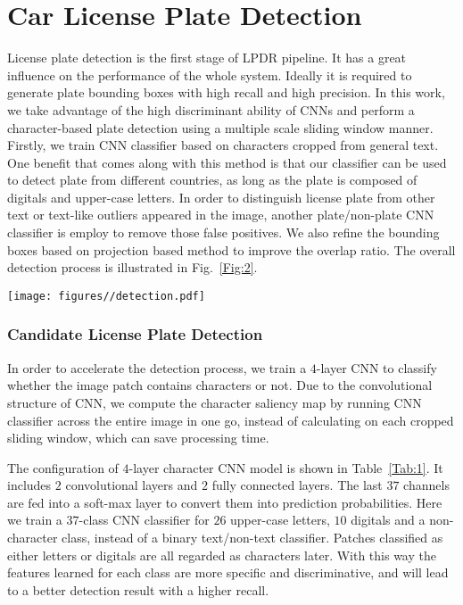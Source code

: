 \documentclass[twocolumn]{svjour3}
\begin{document}
\section{Car License Plate Detection}\label{sec:Detection}

License plate detection is the first stage of LPDR pipeline. It has a great influence on the performance of the whole system. Ideally it is required to generate plate bounding boxes with high recall and high precision. In this work, we take advantage of the high discriminant ability of CNNs and perform a character-based plate detection using a multiple scale sliding window manner. Firstly, we train CNN classifier based on characters cropped from general text. One benefit that comes along with this method is that our classifier can be used to detect plate from different countries, as long as the plate is composed of digitals and upper-case letters. %
In order to distinguish license plate from other text or text-like outliers appeared in the image, %
another plate/non-plate CNN classifier is employ to remove those false positives. We also refine the bounding boxes based on projection based method to improve the overlap ratio.  The overall detection process is illustrated in Fig.~\ref{Fig:2}.

\begin{figure*}[tb]
\centering
\texttt{[image: figures//detection.pdf]}
\caption{license plate detection procedure in a single scale. (a) input image. (b) text salience map generated by CNN classifier. (c) text salience map after NMS and RLSA. (d) candidate bounding boxes generated by CCA. (e) candidate bounding boxes after false positive elimination. (f) final bounding boxes after box refinement.}
\label{Fig:2}
\end{figure*}\setcounter{subsubsection}{0}\subsubsection{Candidate License Plate Detection}
In order to accelerate the detection process, we train a $4$-layer CNN to classify whether the image patch contains characters or not. Due to the convolutional structure of CNN, we compute the character saliency map by running CNN classifier across the entire image in one go, instead of calculating on each cropped sliding window, which can save processing time.

The configuration of $4$-layer character CNN model is shown in Table~\ref{Tab:1}. It includes $2$ convolutional layers and $2$ fully connected layers. The last $37$ channels are fed into a soft-max layer to convert them into prediction probabilities. %
Here we train a $37$-class CNN classifier for $26$ upper-case letters, $10$ digitals and a non-character class, instead of a binary text/non-text classifier. Patches classified as either letters or digitals are all regarded as characters later. With this way the features learned for each class are more specific and discriminative, and will lead to a better detection result with a higher recall.
\end{document}
